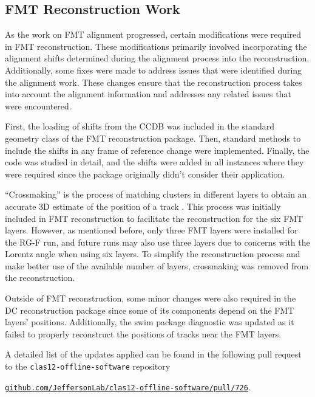 \subsection{FMT Reconstruction Work}
\label{12.30::fmt_reconstruction_work}
    As the work on FMT alignment progressed, certain modifications were required in FMT reconstruction.
    These modifications primarily involved incorporating the alignment shifts determined during the alignment process into the reconstruction.
    Additionally, some fixes were made to address issues that were identified during the alignment work.
    These changes ensure that the reconstruction process takes into account the alignment information and addresses any related issues that were encountered.

    First, the loading of shifts from the CCDB was included in the standard geometry class of the FMT reconstruction package.
    Then, standard methods to include the shifts in any frame of reference change were implemented.
    Finally, the code was studied in detail, and the shifts were added in all instances where they were required since the package originally didn't consider their application.

    ``Crossmaking'' is the process of matching clusters in different layers to obtain an accurate 3D estimate of the position of a track \cite{ziegler2020}.
    This process was initially included in FMT reconstruction to facilitate the reconstruction for the six FMT layers.
    However, as mentioned before, only three FMT layers were installed for the RG-F run, and future runs may also use three layers due to concerns with the Lorentz angle when using six layers.
    To simplify the reconstruction process and make better use of the available number of layers, crossmaking was removed from the reconstruction.

    Outside of FMT reconstruction, some minor changes were also required in the DC reconstruction package since some of its components depend on the FMT layers' positions.
    Additionally, the swim package diagnostic was updated as it failed to properly reconstruct the positions of tracks near the FMT layers.

    A detailed list of the updates applied can be found in the following pull request to the \texttt{clas12-offline-software} repository

    \href{https://github.com/JeffersonLab/clas12-offline-software/pull/726}{\texttt{github.com/JeffersonLab/clas12-offline-software/pull/726}}.
